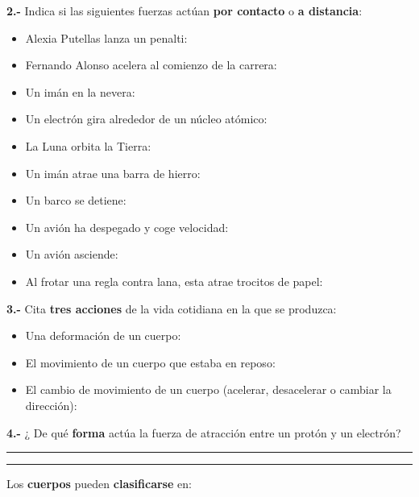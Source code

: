\documentclass[
  letterpaper,
  DIV=11,
  numbers=noendperiod]{scrreprt}
\begin{document}
\textbf{2.-} Indica si las siguientes fuerzas actúan \textbf{por
contacto} o \textbf{a distancia}:

\begin{itemize}
\item
  Alexia Putellas lanza un penalti:
\item
  Fernando Alonso acelera al comienzo de la carrera:
\item
  Un imán en la nevera:
\item
  Un electrón gira alrededor de un núcleo atómico:
\item
  La Luna orbita la Tierra:
\item
  Un imán atrae una barra de hierro:
\item
  Un barco se detiene:
\item
  Un avión ha despegado y coge velocidad:
\item
  Un avión asciende:
\item
  Al frotar una regla contra lana, esta atrae trocitos de papel:
\end{itemize}

\textbf{3.-} Cita \textbf{tres acciones} de la vida cotidiana en la que
se produzca:

\begin{itemize}
\item
  Una deformación de un cuerpo:
\item
  El movimiento de un cuerpo que estaba en reposo:
\item
  El cambio de movimiento de un cuerpo (acelerar, desacelerar o cambiar
  la dirección):
\end{itemize}

\textbf{4.-} ¿ De qué \textbf{forma} actúa la fuerza de atracción entre
un protón y un electrón?

\begin{center}\rule{0.5\linewidth}{0.5pt}\end{center}

\begin{center}\rule{0.5\linewidth}{0.5pt}\end{center}

Los \textbf{cuerpos} pueden \textbf{clasificarse} en:
\end{document}
